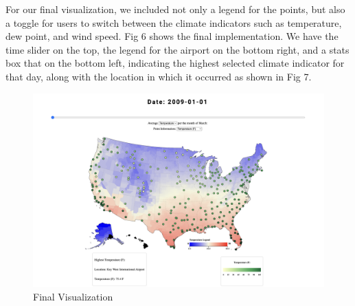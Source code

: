 \documentclass[9pt,twocolumn,twoside]{opticajnl}
\begin{document}
For our final visualization, we included not only a legend for the points, but also a toggle for users to switch between the climate indicators such as temperature, dew point, and wind speed. Fig 6 shows the final implementation. We have the time slider on the top, the legend for the airport on the bottom right, and a stats box that on the bottom left, indicating the highest selected climate indicator for that day, along with the location in which it occurred as shown in Fig 7.

\begin{figure}
    \centering
    \includegraphics[scale=0.15]{images/img7.png}
    \caption{Final Visualization}


\end{figure}
\end{document}

